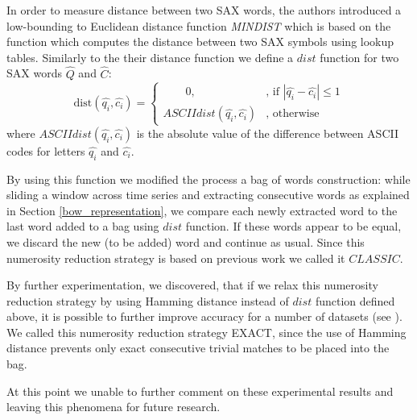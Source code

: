 \documentclass{llncs}
\begin{document}
In order to measure distance between two SAX words, the authors introduced a low-bounding 
to Euclidean distance function \textit{MINDIST} \cite{streaming_sax} which is based on the 
function which computes the distance between two SAX symbols using lookup tables.
Similarly to the their distance function we define a $dist$ function for two
SAX words $\hat{Q}$ and $\hat{C}$:
\begin{equation}
 \mbox{dist}(\hat{q_{i}},\hat{c_{i}})=
        \begin{cases} \qquad  0, & \mbox{, if } | \hat{q_{i}} - \hat{c_{i}} | \leq 1 \\
         ASCIIdist( \hat{q_{i}} , \hat{c_{i}} ) & \mbox{, otherwise } 
        \end{cases}
\end{equation} 
where $ASCIIdist( \hat{q_{i}}, \hat{c_{i}} )$ is the absolute value of the difference between 
ASCII codes for letters $\hat{q_{i}}$ and $\hat{c_{i}}$.

By using this function we modified the process a bag of words construction: 
while sliding a window across time series and extracting consecutive words
as explained in Section \ref{bow_representation}, we compare each newly 
extracted word to the last word added to a bag using $dist$ function. 
If these words appear to be equal, we discard the new (to be added) word and 
continue as usual. Since this numerosity reduction strategy is based 
on previous work we called it $CLASSIC$.

By further experimentation, we discovered, that if we relax this numerosity reduction
strategy by using Hamming distance \cite{hamming} instead of $dist$ function
defined above, it is possible to further improve accuracy for a number of datasets 
(see \cite{jmotif}). We called this numerosity reduction strategy EXACT, since 
the use of Hamming distance prevents only exact consecutive trivial matches to 
be placed into the bag. 

At this point we unable to further comment on these experimental results and 
leaving this phenomena for future research.
\end{document}
